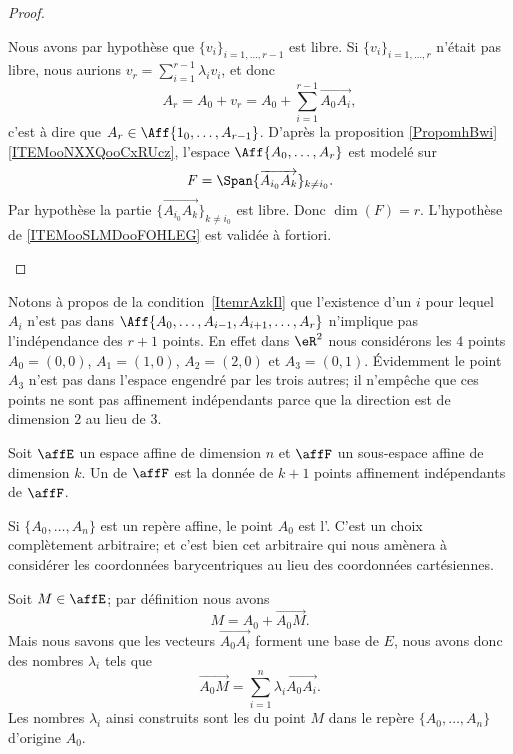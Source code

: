 \begin{proof}
\begin{subproof}
		Nous avons par hypothèse que \( \{ v_i \}_{i=1,\ldots,r-1}\) est libre. Si \( \{ v_i \}_{i=1,\ldots,r}\) n'était pas libre, nous aurions \( v_r=\sum_{i=1}^{r-1}\lambda_iv_i \), et donc
		\begin{equation}
			A_r=A_0+v_r=A_0+\sum_{i=1}^{r-1}\overrightarrow{A_0A_i},
		\end{equation}
		c'est à dire que \( A_r\in \Aff\{ 1_0,\ldots,A_{r-1} \}\).
		D'après la proposition \ref{PropomhBwi}\ref{ITEMooNXXQooCxRUcz}, l'espace \( \Aff\{ A_0,\ldots,A_r \}\) est modelé sur
		\begin{equation}
			F=\Span\{ \overrightarrow{A_{i_0}A_k} \}_{k\neq i_0}.
		\end{equation}
		Par hypothèse la partie \( \{ \overrightarrow{A_{i_0}A_k} \}_{k\neq i_0}\) est libre. Donc \( \dim(F)=r\).
		L'hypothèse de \ref{ITEMooSLMDooFOHLEG} est validée à fortiori.
	\end{subproof}
\end{proof}

Notons à propos de la condition~\ref{ItemrAzkIl} que l'existence d'un \( i\) pour lequel \( A_i\) n'est pas dans \(\Aff\{ A_0,\ldots, A_{i-1},A_{i+1},\ldots, A_r \}\) n'implique pas l'indépendance des \( r+1\) points. En effet dans \( \eR^2\) nous considérons les \( 4\) points \( A_0=(0,0)\), \( A_1=(1,0)\), \( A_2=(2,0)\) et \( A_3=(0,1)\). Évidemment le point \( A_3\) n'est pas dans l'espace engendré par les trois autres; il n'empêche que ces points ne sont pas affinement indépendants parce que la direction est de dimension \( 2\) au lieu de \( 3\).

\begin{definition}  \label{DefguuwEO}
	Soit \( \affE\) un espace affine de dimension \( n\) et \( \affF\) un sous-espace affine de dimension \( k\). Un  de \( \affF\) est la donnée de \( k+1\) points affinement indépendants de \( \affF\).
\end{definition}
Si \( \{ A_0,\ldots, A_n \}\) est un repère affine, le point \( A_0\) est l'. C'est un choix complètement arbitraire; et c'est bien cet arbitraire qui nous amènera à considérer les coordonnées barycentriques au lieu des coordonnées cartésiennes.

Soit \( M\in \affE\); par définition nous avons
\begin{equation}
	M=A_0+\overrightarrow{ A_0M }.
\end{equation}
Mais nous savons que les vecteurs \( \overrightarrow{ A_0A_i }\) forment une base de \( E\), nous avons donc des nombres \( \lambda_i\) tels que
\begin{equation}
	\overrightarrow{ A_0M }=\sum_{i=1}^n\lambda_i\overrightarrow{ A_0A_i }.
\end{equation}
Les nombres \( \lambda_i\) ainsi construits sont les  du point \( M\) dans le repère \( \{ A_0,\ldots, A_n \}\) d'origine \( A_0\).

